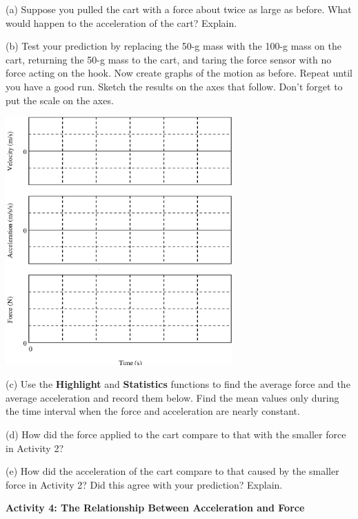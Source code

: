 (a) Suppose you pulled the cart with a force about twice as large as before.
What would happen to the acceleration of the cart? Explain.
\answerspace{20mm}

\pagebreak[3]
(b) Test your prediction by replacing the 50-g mass with the 100-g mass on the cart, 
returning the 50-g mass to the cart, and taring the force sensor with no force acting on the hook.
Now create graphs of the motion as before. 
Repeat until you have a good run. Sketch the
results on the axes that follow. Don't forget to put the scale on the axes.

\vspace{0.3cm}
{\par\centering \includegraphics[width=0.65\textwidth]{force1/force1_fig5.eps} \par}
\vspace{0.3cm}

(c) Use the \textbf{Highlight} and  \textbf{Statistics} functions to find the 
average force and the average acceleration
and record them below. Find the mean values only during the time interval when
the force and acceleration are nearly constant.
\answerspace{15mm}

(d) How did the force applied to the cart compare to that with the smaller force
in Activity 2?
\answerspace{15mm}

(e) How did the acceleration of the cart compare to that caused by the smaller
force in Activity 2? Did this agree with your prediction? Explain.
\answerspace{15mm}

\pagebreak[2]
\textbf{Activity 4: The Relationship Between Acceleration and Force }

